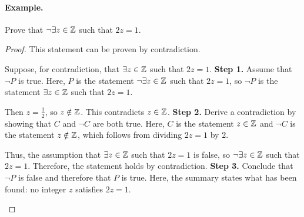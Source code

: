 \paragraph{Example.}
\begin{exercise}{
    Prove that $\neg\exists z \in \mathbb{Z}$ such that $2z = 1$.
}
\end{exercise}
\begin{proof}{
    This statement can be proven by contradiction.

    \begin{annotatedpanel}[Setup.]{
        Suppose, for contradiction, that $\exists z \in \mathbb{Z}$ such that %
        $2z = 1$.
    }{
        \textbf{Step 1.} Assume that $\neg P$ is true. %
        Here, $P$ is the statement $\neg\exists z \in \mathbb{Z}$ such that %
        $2z = 1$, so $\neg P$ is the statement $\exists z \in \mathbb{Z}$ such that %
        $2z = 1$.
    }
    \end{annotatedpanel}

    \begin{annotatedpanel}[Verification.]{
        Then $z = \frac{1}{2}$, so $z \notin \mathbb{Z}$. %
        This contradicts $z \in \mathbb{Z}$.
    }{
        \textbf{Step 2.} Derive a contradiction by showing that $C$ and %
        $\neg C$ are both true. %
        Here, $C$ is the statement $z \in \mathbb{Z}$ and $\neg C$ is the %
        statement $z \notin \mathbb{Z}$, which follows from dividing $2z = 1$ %
        by $2$.
    }
    \end{annotatedpanel}

    \begin{annotatedpanel}[Conclusion.]{
        Thus, the assumption that $\exists z \in \mathbb{Z}$ such that $2z = 1$ %
        is false, so $\neg\exists z \in \mathbb{Z}$ such that $2z = 1$. %
        Therefore, the statement holds by contradiction. \qedhere
    }{
        \textbf{Step 3.} Conclude that $\neg P$ is false and therefore that %
        $P$ is true. %
        Here, the summary states what has been found: %
        no integer $z$ satisfies $2z = 1$.
    }
    \end{annotatedpanel}
}
\end{proof}